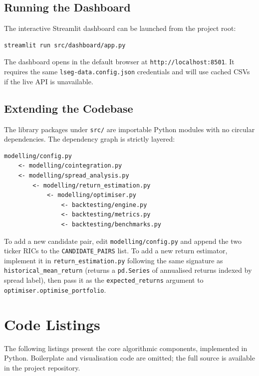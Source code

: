 \documentclass[a4paper]{report}
\begin{document}
\subsection{Running the Dashboard}

The interactive Streamlit dashboard can be launched from the project root:

\begin{Verbatim}[fontsize=\small, baselinestretch=0.9]
streamlit run src/dashboard/app.py
\end{Verbatim}

The dashboard opens in the default browser at \texttt{http://localhost:8501}.  It requires the same \texttt{lseg-data.config.json} credentials and will use cached CSVs if the live API is unavailable.

\subsection{Extending the Codebase}

The library packages under \texttt{src/} are importable Python modules with no circular dependencies.  The dependency graph is strictly layered:

\begin{Verbatim}[fontsize=\small, baselinestretch=0.9]
modelling/config.py
    <- modelling/cointegration.py
    <- modelling/spread_analysis.py
        <- modelling/return_estimation.py
            <- modelling/optimiser.py
                <- backtesting/engine.py
                <- backtesting/metrics.py
                <- backtesting/benchmarks.py
\end{Verbatim}

To add a new candidate pair, edit \texttt{modelling/config.py} and append the two ticker RICs to the \texttt{CANDIDATE\_PAIRS} list.  To add a new return estimator, implement it in \texttt{return\_estimation.py} following the same signature as \texttt{historical\_mean\_return} (returns a \texttt{pd.Series} of annualised returns indexed by spread label), then pass it as the \texttt{expected\_returns} argument to \texttt{optimiser.optimise\_portfolio}.


\section{Code Listings}

The following listings present the core algorithmic components, implemented in Python. Boilerplate and visualisation code are omitted; the full source is available in the project repository.
\end{document}
